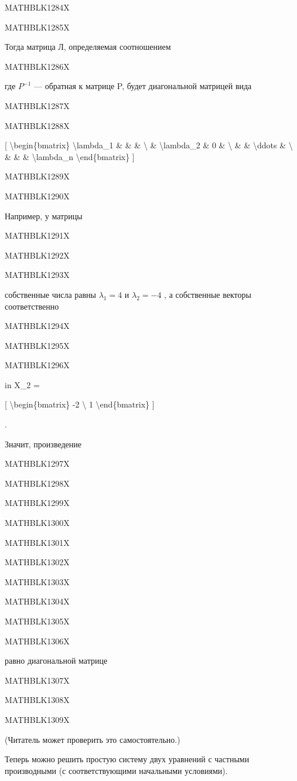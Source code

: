 \documentclass[
]{article}
\begin{document}
{{{MATHBLK1284X

MATHBLK1285X

Тогда матрица Л, определяемая соотношением

MATHBLK1286X

где \(P^{-1}\) --- обратная к матрице P, будет диагональной матрицей
вида

MATHBLK1287X

MATHBLK1288X

{[} \textbackslash begin\{bmatrix\} \textbackslash lambda\_1 \& \& \&
\textbackslash{} \& \textbackslash lambda\_2 \& 0 \& \textbackslash{} \&
\& \textbackslash ddots \& \textbackslash{} \& \& \&
\textbackslash lambda\_n \textbackslash end\{bmatrix\} {]}

MATHBLK1289X

MATHBLK1290X

Например, у матрицы

MATHBLK1291X

MATHBLK1292X

MATHBLK1293X

собственные числа равны \(\lambda_ 1 = 4\) и \(\lambda_2 = -4\) , а
собственные векторы соответственно

MATHBLK1294X

MATHBLK1295X

MATHBLK1296X

in X\_2 =

{[} \textbackslash begin\{bmatrix\} -2 \textbackslash{} 1
\textbackslash end\{bmatrix\} {]}

.

Значит, произведение

MATHBLK1297X

MATHBLK1298X

MATHBLK1299X

MATHBLK1300X

MATHBLK1301X

MATHBLK1302X

MATHBLK1303X

MATHBLK1304X

MATHBLK1305X

MATHBLK1306X

равно диагональной матрице

MATHBLK1307X

MATHBLK1308X

MATHBLK1309X

(Читатель может проверить это самостоятельно.)

Теперь можно решить простую систему двух уравнений с частными
производными (с соответствующими начальными условиями).

}}}
\end{document}
